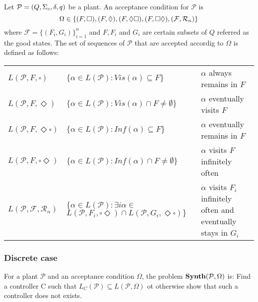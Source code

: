\documentclass[table]{beamer}
\begin{document}
\begin{frame}
	\begin{dfn}
		Let $\mathcal{P}=(Q,\Sigma_c,\delta, q)$ be a plant. An acceptance condition for $\mathcal{P}$ is
		$$ \Omega \in \{(F,\square),(F,\Diamond ),(F,\Diamond\square),(F,\square\Diamond),(\mathcal{F},\mathcal{R}_n)\}$$
		where $\mathcal{F} = \{(F_i,G_i)\}^{n}_{i=1}$ and $F, F_i$ and $G_i$ 
		are certain subsets of $Q$ referred as the good states. The set of sequences of $\mathcal{P}$ that are accepted
		accordig to $\Omega$ is defined as follows:
	\end{dfn}
	\begin{adjustwidth}{-1cm}{-1cm}
	\begin{table}[]
		\begin{tabular}{lll}
		\hline
		\rowcolor{azzurro_chiaro}
		$L(\mathcal{P},F,\square)$ & $\{\alpha \in L(\mathcal{P}):Vis(\alpha)\subseteq F\}$ & $\alpha$ always remains in $F$ \\ 
		$L(\mathcal{P},F,\Diamond)$ & $\{\alpha \in L(\mathcal{P}):Vis(\alpha)\cap F \neq \emptyset\}$ & $\alpha$ eventually visits $F$ \\ 
		\rowcolor{azzurro_chiaro}
		$L(\mathcal{P},F,\Diamond\square)$ & $\{\alpha \in L(\mathcal{P}):Inf(\alpha)\subseteq F\}$ & $\alpha$ eventually remains in $F$ \\ 
		$L(\mathcal{P},F,\square\Diamond)$ & $\{\alpha \in L(\mathcal{P}):Inf(\alpha)\cap F \neq \emptyset\}$ & $\alpha$ visits $F$ infinitely often \\ 
		\rowcolor{azzurro_chiaro}
		$L(\mathcal{P},\mathcal{F},\mathcal{R}_n)$ & \shortstack{
			$\{\alpha \in L(\mathcal{P}): \exists i \alpha \in$ \\
			$L(\mathcal{P},F_i,\square\Diamond) \cap L(\mathcal{P},G_i,\Diamond\square)\}$
		} & 
		\shortstack{
			$\alpha$ visits $F_i$ infinitely often \\
			 and eventually stays in $G_i$ }\\ \hline
		\end{tabular}
	\end{table}
	\end{adjustwidth}
\end{frame}

\begin{frame}
	\frametitle{Discrete case}
	\begin{dfn}
		For a plant $\mathcal{P}$ and an acceptance condition $\Omega$, the problem $\textbf{Synth}(\mathcal{P},\Omega)$ is:
		Find a controller C such that $L_C(\mathcal{P})\subseteq L(\mathcal{P},\Omega)$ ot otherwise show that such
		 a controller does not exists.
	\end{dfn}
\end{frame}
\end{document}
